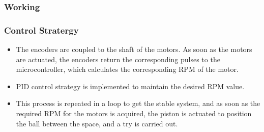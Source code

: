         \subsubsection{Working}

        \subsubsection{Control Stratergy}
            \begin{itemize}
                \item The encoders are coupled to the shaft of the motors. As soon as the motors are actuated, the encoders
                return the corresponding pulses to the microcontroller, which calculates the corresponding RPM of the
                motor.
                \item PID control strategy is implemented to maintain the desired RPM value.
                \item This process is repeated in a loop to get the stable system, and as soon as the required RPM for the
                motors is acquired, the piston is actuated to position the ball between the space, and a try is carried
                out.      
            \end{itemize}  

